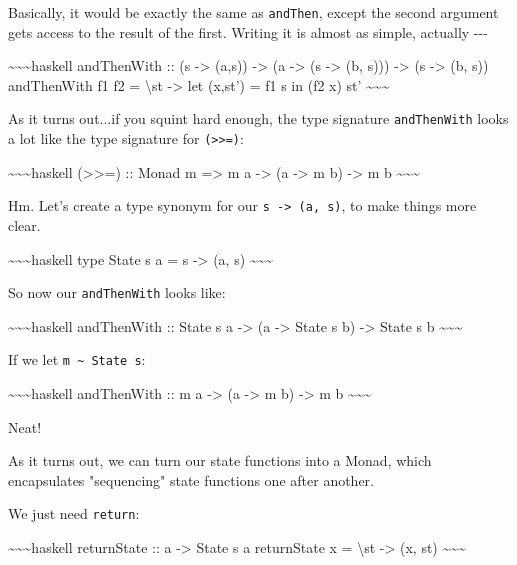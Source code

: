 \documentclass[]{article}
\begin{document}
Basically, it would be exactly the same as \texttt{andThen}, except the second
argument gets access to the result of the first. Writing it is almost as simple,
actually -\/-\/-

\textasciitilde{}\textasciitilde{}\textasciitilde{}haskell andThenWith :: (s
-\textgreater{} (a,s)) -\textgreater{} (a -\textgreater{} (s -\textgreater{} (b,
s))) -\textgreater{} (s -\textgreater{} (b, s)) andThenWith f1 f2 =
\textbackslash{}st -\textgreater{} let (x,st') = f1 s in (f2 x) st'
\textasciitilde{}\textasciitilde{}\textasciitilde{}

As it turns out...if you squint hard enough, the type signature
\texttt{andThenWith} looks a lot like the type signature for
\texttt{(\textgreater{}\textgreater{}=)}:

\textasciitilde{}\textasciitilde{}\textasciitilde{}haskell
(\textgreater{}\textgreater{}=) :: Monad m =\textgreater{} m a -\textgreater{}
(a -\textgreater{} m b) -\textgreater{} m b
\textasciitilde{}\textasciitilde{}\textasciitilde{}

Hm. Let's create a type synonym for our \texttt{s\ -\textgreater{}\ (a,\ s)}, to
make things more clear.

\textasciitilde{}\textasciitilde{}\textasciitilde{}haskell type State s a = s
-\textgreater{} (a, s) \textasciitilde{}\textasciitilde{}\textasciitilde{}

So now our \texttt{andThenWith} looks like:

\textasciitilde{}\textasciitilde{}\textasciitilde{}haskell andThenWith :: State
s a -\textgreater{} (a -\textgreater{} State s b) -\textgreater{} State s b
\textasciitilde{}\textasciitilde{}\textasciitilde{}

If we let \texttt{m\ \textasciitilde{}\ State\ s}:

\textasciitilde{}\textasciitilde{}\textasciitilde{}haskell andThenWith :: m a
-\textgreater{} (a -\textgreater{} m b) -\textgreater{} m b
\textasciitilde{}\textasciitilde{}\textasciitilde{}

Neat!

As it turns out, we can turn our state functions into a Monad, which
encapsulates "sequencing" state functions one after another.

We just need \texttt{return}:

\textasciitilde{}\textasciitilde{}\textasciitilde{}haskell returnState :: a
-\textgreater{} State s a returnState x = \textbackslash{}st -\textgreater{} (x,
st) \textasciitilde{}\textasciitilde{}\textasciitilde{}
\end{document}
